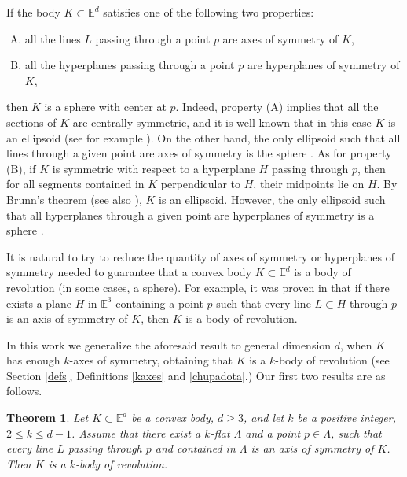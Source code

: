 \documentclass[12pt,thmsa]{amsart}
\newcommand{\Et}{\mathbb{E}^3}
\newcommand{\Ed}{\mathbb{E}^{d}}
\newtheorem{theorem}{Theorem}
\begin{document}
If the body $K \subset \Ed$ satisfies one of the following two properties:  
\begin{enumerate}[(A)] 
\item all the lines $L$ passing through a point $p$ are axes of symmetry of $K$, 
\item all the hyperplanes passing through a point $p$ are hyperplanes of symmetry of $K$, 
\end{enumerate}
then $K$ is a sphere with center at $p$. Indeed, property (A) implies that all the sections of $K$ are centrally symmetric, and it is well known that in this case $K$ is an ellipsoid (see for example \cite{bg,la,mm1}). On the other hand, the only ellipsoid such that all lines through a given point are axes of symmetry is the sphere \cite{Au}.
As for property (B), if $K$ is symmetric with respect to a hyperplane $H$ passing through $p$, then for all segments contained in $K$ perpendicular to $H$, their midpoints lie on $H$. By Brunn's theorem \cite{br} (see also \cite[pg 44]{mmo}), $K$ is an ellipsoid. However, the only ellipsoid such that all hyperplanes  through a given point are hyperplanes of symmetry is a sphere \cite{AM}.

It is natural to try to reduce the quantity of axes of symmetry or hyperplanes of symmetry needed to guarantee that a convex body $K\subset \Ed$ is a body of revolution (in some cases, a sphere).  For example,  it was proven in \cite{jemomo} that if there exists a plane $H$ in $\Et$ containing a point $p$ such that every line $L\subset H$ through $p$ is an axis of symmetry of $K$, then $K$ is a body of revolution. 


In this work we generalize the aforesaid result to general dimension $d$, when $K$ has enough $k$-axes of symmetry, obtaining that $K$ is a $k$-body of revolution (see Section \ref{defs}, Definitions \ref{kaxes} and \ref{chupadota}.) Our first two results are as follows.

\begin{theorem}\label{grandota}
Let $K\subset \Ed$ be a convex body, $d\geq 3$, and let $k$ be a positive integer, $2\leq k\leq d-1$. Assume that there exist a $k$-flat $\Lambda$ and a point $p\in \Lambda$,  such that every line $L$ passing through $p$ and contained in $\Lambda$ is an axis of symmetry of $K$. Then $K$ is a $k$-body of revolution.
\end{theorem}

\end{document}
